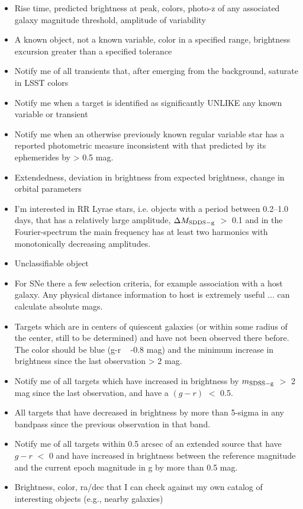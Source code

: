 \documentclass{article}
\begin{document}
\begin{itemize}
\item Rise time, predicted brightness at peak, colors, photo-z of any associated galaxy magnitude threshold, amplitude of variability 
\item A known object, not a known variable, color in a specified range, brightness excursion greater than a specified tolerance
\item Notify me of all transients that, after emerging from the background, saturate in LSST colors
\item Notify me when a target is identified as significantly UNLIKE any known variable or transient
\item Notify me when an otherwise previously known regular variable star has a reported photometric measure inconsistent with that predicted by its ephemerides by > 0.5 mag.
\item Extendedness, deviation in brightness from expected brightness, change in orbital parameters
\item I'm interested in RR Lyrae stars, i.e. objects with a period between 0.2--1.0 days, that has a relatively large amplitude, $\Delta M_{\rm{SDDS-g}}$ $>$ 0.1 and in the Fourier-spectrum the main frequency has at least two harmonics with monotonically decreasing amplitudes. 
\item Unclassifiable object
\item For SNe there a few selection criteria, for example association with a host galaxy. Any physical distance information to host is extremely useful ... can calculate absolute mags. 
\item Targets which are in centers of quiescent galaxies (or within some radius of the center, still to be determined) and have not been observed there before. The color should be blue (g-r ~ -0.8 mag) and the minimum increase in brightness since the last observation > 2 mag.
\item Notify me of all targets which have increased in brightness by $m_{\rm{SDSS-g}}$ $>$ 2\,mag since the last observation, and have a $(g-r)$ $<$ 0.5.
\item All targets that have decreased in brightness by more than 5-sigma in any bandpass since the previous observation in that band. 
\item Notify me of all targets within 0.5 arcsec of an extended source that have $g-r$ $<$ 0 and have increased in brightness between the reference magnitude and the current epoch magnitude in g by more than 0.5 mag.
\item Brightness, color, ra/dec that I can check against my own catalog of interesting objects (e.g., nearby galaxies)

\end{itemize}
\end{document}
